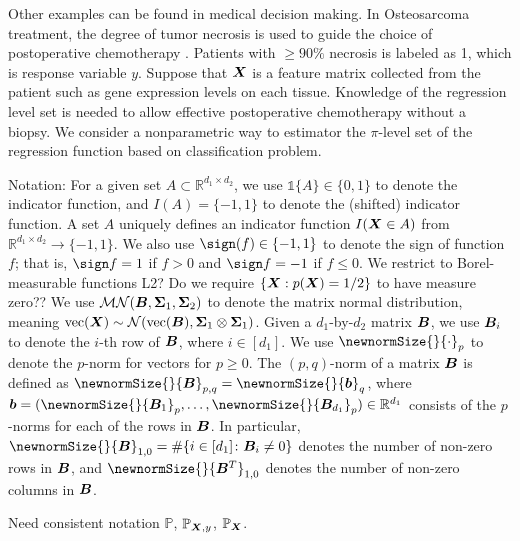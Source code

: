 \documentclass[12pt]{article}
\begin{document}
Other examples can be found in medical decision making. In Osteosarcoma treatment, the degree of tumor necrosis is used to guide the choice of postoperative chemotherapy \citep{man2005expression}. Patients with $\geq 90 \%$ necrosis is labeled as 1, which is response variable $y$. Suppose that $\bm X$ is a feature matrix collected from the patient such as gene expression levels on each tissue. Knowledge of the regression level set is needed to allow effective postoperative chemotherapy without a biopsy. 
We consider a nonparametric way to estimator the $\pi$-level set of the regression function based on classification problem.


Notation: For a given set $A\subset \mathbb{R}^{d_1\times d_2}$, we use $\mathds{1}\{A\}\in\{0,1\}$ to denote the indicator function, and $I(A) =\{-1,1\}$ to denote the (shifted) indicator function. A set $A$ uniquely defines an indicator function $I(\bm X\in A)$ from $\mathbb{R}^{d_1\times d_2}\to \{-1,1\}$. We also use $\sign(f)\in\{-1,1\}$ to denote the sign of function $f$; that is, $\sign f=1$ if $f>0$ and $\sign f=-1$ if $f\leq 0$. We restrict to Borel-measurable functions {\color{red}{and} L2}? Do we require $\{\bm X:p(\bm X)=1/2\}$ to have measure zero??  %
We use $\mathcal{MN}(\bm B, \bm \Sigma_1, \bm \Sigma_2)$ to denote the matrix normal distribution, meaning $\text{vec}(\bm X)\sim\mathcal{N}(\text{vec}(\bm B), \bm \Sigma_1\otimes \bm \Sigma_1)$. Given a $d_1$-by-$d_2$ matrix $\bm B$, we use $\bm B_i$ to denote the $i$-th row of $\bm B$, where $i\in[d_1]$. We use $\newnormSize{}{\cdot}_p$ to denote the $p$-norm for vectors for $p\geq 0$. The $(p,q)$-norm of a matrix $\bm B$ is defined as $\newnormSize{}{\mB}_{p,q}=\newnormSize{}{\mb}_q$, where $\mb=(\newnormSize{}{\mB_1}_p,\ldots,\newnormSize{}{\mB_{d_1}}_p)\in\mathbb{R}^{d_1}$ consists of the $p$-norms for each of the rows in $\bm B$. In particular, $\newnormSize{}{\mB}_{1,0}=\#\{i\in [d_1]\colon \mB_i\neq 0\}$ denotes the number of non-zero rows in $\bm B$, and $\newnormSize{}{\mB^T}_{1,0}$ denotes the number of non-zero columns in $\bm B$.

Need consistent notation $\mathbb{P}$, $\mathbb{P}_{\bm X,y}$, $\mathbb{P}_{\bm X}$. 
\end{document}
